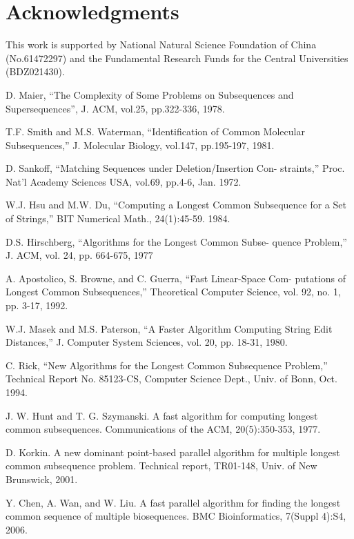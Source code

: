 \documentclass{article}
\begin{document}
\section{Acknowledgments}

This work is supported by National Natural Science Foundation of China
(No.61472297) and the Fundamental Research Funds for the Central
Universities (BDZ021430).


\begin{thebibliography}{99}

 D. Maier, “The Complexity of Some Problems on
  Subsequences and Supersequences”, J. ACM, vol.25, pp.322-336, 1978.


 T.F. Smith and M.S. Waterman, “Identification of
  Common Molecular Subsequences,” J. Molecular Biology, vol.147,
  pp.195-197, 1981.

 D. Sankoff, “Matching Sequences under
  Deletion/Insertion Con- straints,” Proc. Nat’l Academy Sciences
  USA, vol.69, pp.4-6, Jan. 1972.

 W.J. Hsu and M.W. Du, “Computing a Longest Common
  Subsequence for a Set of Strings,” BIT Numerical Math.,
  24(1):45-59. 1984.

 D.S. Hirschberg, “Algorithms for the Longest Common Subse-
quence Problem,” J. ACM, vol. 24, pp. 664-675, 1977

 A. Apostolico, S. Browne, and C. Guerra,
  “Fast Linear-Space Com- putations of Longest Common Subsequences,”
  Theoretical Computer Science, vol. 92, no. 1, pp. 3-17, 1992.

 W.J. Masek and M.S. Paterson, “A Faster Algorithm
  Computing String Edit Distances,” J. Computer System Sciences,
  vol. 20, pp. 18-31, 1980.

 C. Rick, “New Algorithms for the Longest Common
  Subsequence Problem,” Technical Report No. 85123-CS, Computer
  Science Dept., Univ. of Bonn, Oct. 1994.
  
 J. W. Hunt and T. G. Szymanski. A fast algorithm
  for computing longest common subsequences.  Communications of the
  ACM, 20(5):350-353, 1977.

 D. Korkin. A new dominant point-based parallel
  algorithm for multiple longest common subsequence problem. Technical
  report, TR01-148, Univ. of New Brunswick, 2001.

 Y. Chen, A. Wan, and W. Liu. A fast parallel
  algorithm for finding the longest common sequence of multiple
  biosequences. BMC Bioinformatics, 7(Suppl 4):S4, 2006.


\end{thebibliography}
\end{document}
